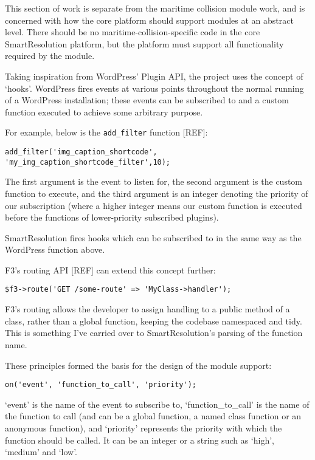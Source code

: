 This section of work is separate from the maritime collision module work, and is concerned with how the core platform should support modules at an abstract level. There should be no maritime-collision-specific code in the core SmartResolution platform, but the platform must support all functionality required by the module.

Taking inspiration from WordPress' Plugin API, the project uses the concept of `hooks'. WordPress fires events at various points throughout the normal running of a WordPress installation; these events can be subscribed to and a custom function executed to achieve some arbitrary purpose.

For example, below is the \lstinline{add_filter} function [REF]: %

\begin{lstlisting}
add_filter('img_caption_shortcode', 'my_img_caption_shortcode_filter',10);
\end{lstlisting}

The first argument is the event to listen for, the second argument is the custom function to execute, and the third argument is an integer denoting the priority of our subscription (where a higher integer means our custom function is executed before the functions of lower-priority subscribed plugins).

SmartResolution fires hooks which can be subscribed to in the same way as the WordPress function above.

F3's routing API [REF] can extend this concept further:

\begin{lstlisting}
$f3->route('GET /some-route' => 'MyClass->handler');
\end{lstlisting}

F3's routing allows the developer to assign handling to a public method of a class, rather than a global function, keeping the codebase namespaced and tidy. This is something I've carried over to SmartResolution's parsing of the function name.

These principles formed the basis for the design of the module support:

\begin{lstlisting}
on('event', 'function_to_call', 'priority');
\end{lstlisting}

`event' is the name of the event to subscribe to, `function\_to\_call' is the name of the function to call (and can be a global function, a named class function or an anonymous function), and `priority' represents the priority with which the function should be called. It can be an integer or a string such as `high', `medium' and `low'.

